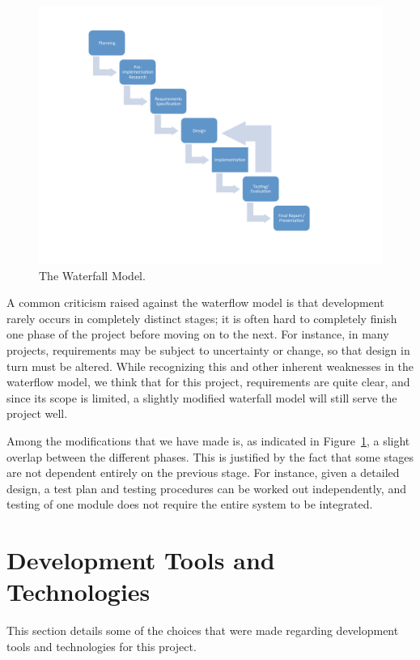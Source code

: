 \begin{figure}
  \begin{center}
    \includegraphics[width=\textwidth]{PrelimStudy/workflow}
    \caption{The Waterfall Model.}
    \label{workflow}
  \end{center}
\end{figure}

A common criticism raised against the waterflow model is that development rarely occurs in completely distinct stages; it is often hard to completely finish one phase of the project before moving on to the next. For instance, in many projects, requirements may be subject to uncertainty or change, so that design in turn must be altered. While recognizing this and other inherent weaknesses in the waterflow model, we think that for this project, requirements are quite clear, and since its scope is limited, a slightly modified waterfall model will still serve the project well. 

Among the modifications that we have made is, as indicated in Figure~\ref{workflow}, a slight overlap between the different phases. This is justified by the fact that some stages are not dependent entirely on the previous stage. For instance, given a detailed design, a test plan and testing procedures can be worked out independently, and testing of one module does not require the entire system to be integrated.



\section{Development Tools and Technologies}\label{DevTools}
This section details some of the choices that were made regarding development tools and technologies for this project.

